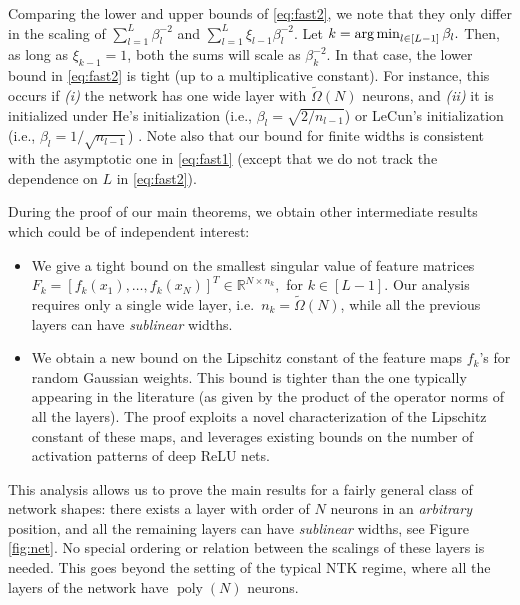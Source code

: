 \documentclass[11pt]{article}
\def\poly{\operatorname{\mathop{poly}}}
\def\RR{\mathbb{R}}
\def\argmin{\mathop{\rm arg\,min}\limits}
\begin{document}
Comparing the lower and upper bounds of \eqref{eq:fast2}, we note that they only differ in the scaling of 
$\sum_{l=1}^{L}\beta_l^{-2}$ and $\sum_{l=1}^{L}\xi_{l-1}\beta_l^{-2}.$
Let $k=\argmin\nolimits_{l\in[L-1]}\beta_l.$
Then, as long as $\xi_{k-1}=1$, both the sums will scale as $\beta_k^{-2}$.
In that case, the lower bound in \eqref{eq:fast2} is tight (up to a multiplicative constant).
For instance, this occurs if \emph{(i)} the network has one wide layer with $\tilde{\Omega}(N)$ neurons, 
and \emph{(ii)} it is initialized under He's initialization (i.e., $\beta_{l}=\sqrt{2/n_{l-1}}$)
or LeCun's initialization (i.e., $\beta_{l}=1/\sqrt{n_{l-1}}$) \citep{XavierBengio2010,he2015delving,lecun2012efficient}.
Note also that our bound for finite widths is consistent with the asymptotic one in \eqref{eq:fast1} (except that we do not track the dependence on $L$ in \eqref{eq:fast2}).

During the proof of our main theorems, we obtain other intermediate results which could be of independent interest:
\begin{itemize}
    \item We give a tight bound on the smallest singular value of feature matrices $F_k=[f_k(x_1), \ldots, f_k(x_N)]^T\in\RR^{N\times n_k},$ for $k\in[L-1]$. Our analysis requires only  a single wide layer, i.e.\ $n_k=\tilde{\Omega}(N)$, while all the previous layers can have {\em sublinear} widths.
    \item We obtain a new bound on the Lipschitz constant of the feature maps $f_k$'s for random Gaussian weights. %
    This bound is tighter than the one typically appearing in the literature (as given by the product of the operator norms of all the layers).
    The proof exploits a novel characterization of the Lipschitz constant of these maps, and leverages existing bounds on the number of activation patterns of deep ReLU nets.
\end{itemize}
This analysis allows us to prove the main results for a fairly general class of network shapes: 
there exists a layer with order  of $N$ neurons in an {\em arbitrary} position, and all the remaining layers can have {\em sublinear} widths, see Figure \ref{fig:net}.
No special ordering or relation between the scalings of these layers is needed. This goes beyond the setting of the typical NTK regime, where all the layers of the network have $\poly(N)$ neurons.
\end{document}
